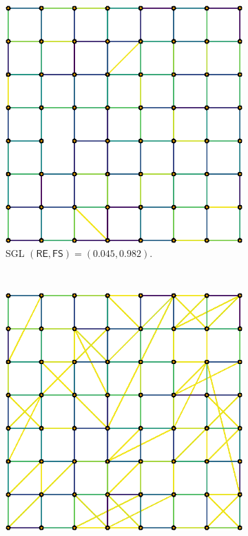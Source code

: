 \begin{figure}[!htb]
\begin{subfigure}[b]{0.3\textwidth}
        \includegraphics[width=\textwidth]{grid/latex/figures/sgl_grid.eps}
        \caption{\textsf{SGL} $(\mathsf{RE}, \mathsf{FS}) = (0.045, 0.982)$.}
    \end{subfigure}
    ~
    \begin{subfigure}[b]{0.3\textwidth}
        \includegraphics[width=\textwidth]{grid/latex/figures/cgl_grid.eps}

\end{subfigure}
\end{figure}
